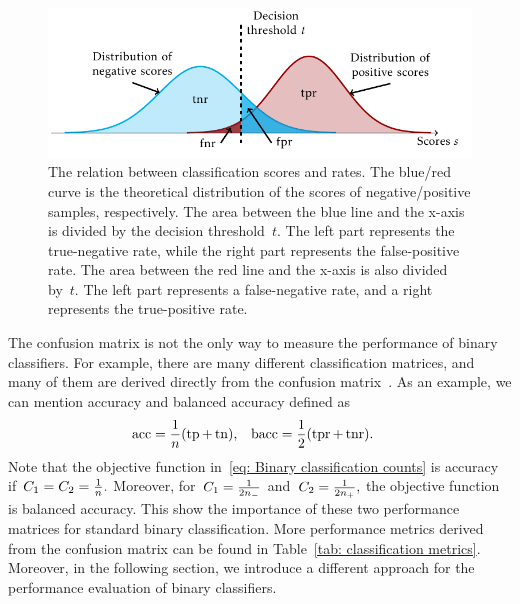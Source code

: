 \begin{figure}
  \centering
  \includegraphics{images/confusion_rates.pdf}
  \caption{The relation between classification scores and  rates. The blue/red curve is the theoretical distribution of the scores of negative/positive samples, respectively. The area between the blue line and the x-axis is divided by the decision threshold~$t.$ The left part represents the true-negative rate, while the right part represents the false-positive rate. The area between the red line and the x-axis is also divided by~$t.$ The left part represents a false-negative rate, and a right represents the true-positive rate.}
  \label{fig: scores and rates}
\end{figure}

The confusion matrix is not the only way to measure the performance of binary classifiers. For example, there are many different classification matrices, and many of them are derived directly from the confusion matrix~\cite{fawcett2006introduction, metz1978basic, brodersen2010balanced, hossin2015review}. As an example, we can mention accuracy and balanced accuracy defined as
\begin{align*}
  \accuracy & = \frac{1}{n}\Brac{\tp + \tn}, &
  \baccuracy & = \frac{1}{2}\Brac{\tpr + \tnr}.
\end{align*}
Note that the objective function in~\eqref{eq: Binary classification counts} is accuracy if~$C_1 = C_2 = \frac{1}{n}.$ Moreover, for~$C_1 = \frac{1}{2n_{-}}$ and~$C_2 = \frac{1}{2n_{+}},$ the objective function is balanced accuracy. This show the importance of these two performance matrices for standard binary classification. More performance metrics derived from the confusion matrix can be found in Table~\ref{tab: classification metrics}. Moreover, in the following section, we introduce a different approach for the performance evaluation of binary classifiers.

